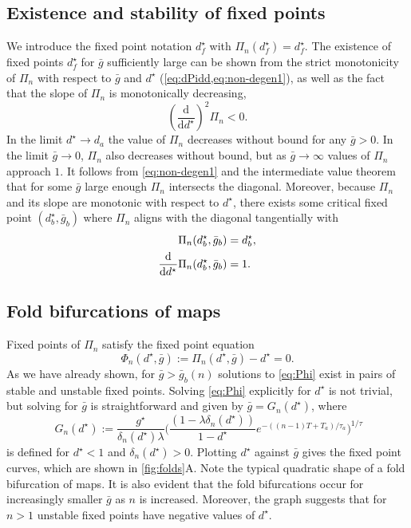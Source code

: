 \documentclass[utf8]{frontiersFPHY} %
\begin{document}
\subsection{Existence and stability of fixed points}
We introduce the fixed point notation $d^\star_{f}$ with $\Pi_n(d^\star_{f})=d^\star_{f}$.
The existence of fixed points $d^\star_{f}$ for $\bar g$ sufficiently large can be shown from the strict monotonicity of $\Pi_{n}$ with respect to $\bar g$ and $d^\star$ (\cref{eq:dPidd,eq:non-degen1}), as well as the fact that the slope of $\Pi_{n}$ is monotonically decreasing,
\begin{equation}
	\label{eq:non-degen2}
	\left(\frac{\mathrm{d}}{\mathrm{d}d^\star}\right)^2 \Pi_n<0.
\end{equation}
In the limit $d^\star \to d_{a}$ the value of $\Pi_n$ decreases without bound for any $\bar g>0$.
In the limit $\bar g\to 0$, $\Pi_n$ also decreases without bound, but as $\bar g\to \infty$ values of $\Pi_n$ approach $1$.
It follows from \cref{eq:non-degen1} and the intermediate value theorem that for some $\bar g$ large enough $\Pi_n$ intersects the diagonal.
Moreover, because $\Pi_n$ and its slope are monotonic with respect to $d^\star$, there exists some critical fixed point $(d^\star_b, \bar g_b)$ where $\Pi_n$ aligns with the diagonal tangentially with
\begin{align}
	\Pi_n(d^\star_b, \bar g_b)               & =d^\star_b, \\
	\dv{}{d^\star}\Pi_n(d^\star_b, \bar g_b) & =1.
\end{align}

\subsection{Fold bifurcations of maps}
Fixed points of $\Pi_n$ satisfy the fixed point equation
\begin{equation}
	\label{eq:Phi}
	\Phi_{n}(d^{\star}, \bar g) := \Pi_{n}(d^{\star}, \bar g)-d^{\star} = 0.
\end{equation}
As we have already shown, for $\bar g > \bar g_b(n)$ solutions to \cref{eq:Phi} exist in pairs of stable and unstable fixed points.
Solving \cref{eq:Phi} explicitly for $d^{\star}$ is not trivial, but solving for $\bar g$ is straightforward and given by $\bar g= G_n(d^\star)$, where
\begin{equation}
	~\label{eq:g}
	G_{n}(d^{\star}) :=
	\frac{g^{\star}}{\delta_n(d^\star)\lambda}
	\Big(
	\frac{(1-\lambda\delta_n(d^\star)) }{1-d^\star} e^{-((n-1)T + T_{a})/\tau_a}
	\Big)^{1/\tau}
\end{equation}
is defined for $d^{\star}<1$ and $\delta_{n}(d^{\star})>0$.
Plotting $d^\star$ against $\bar g$ gives the fixed point curves, which are shown in \cref{fig:folds}A.
Note the typical quadratic shape of a fold bifurcation of maps.
It is also evident that the fold bifurcations occur for increasingly smaller $\bar g$ as $n$ is increased.
Moreover, the graph suggests that for $n>1$ unstable fixed points have negative values of $d^\star$.
\end{document}
